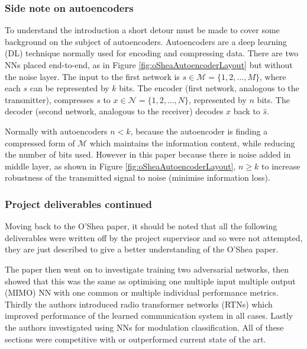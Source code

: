 \documentclass[12pt,onecolumn,letterpaper]{article}
\begin{document}
\subsubsection{Side note on autoencoders}

To understand the introduction a short detour must be made to cover some background on the subject of autoencoders. Autoencoders are a deep learning (DL) technique normally used for encoding and compressing data. There are two NNs placed end-to-end, as in Figure \ref{fig:oSheaAutoencoderLayout} but without the noise layer. The input to the first network is $s \in \mathcal{M} = \{1,2,\dots,M\}$, where each $s$ can be represented by $k$ bits. The encoder (first network, analogous to the transmitter), compresses $s$ to $x \in \mathcal{N} = \{1,2,\dots,N\}$, represented by $n$ bits. The decoder (second network, analogous to the receiver) decodes $x$ back to $\hat{s}$.

Normally with autoencoders $n < k$, because the autoencoder is finding a compressed form of $\mathcal{M}$ which maintains the information content, while reducing the number of bits used. However in this paper because there is noise added in middle layer, as shown in Figure \ref{fig:oSheaAutoencoderLayout}, $n \geq k$ to increase robustness of the transmitted signal to noise (minimise information loss).

\subsubsection{Project deliverables continued}
\label{sec:deliverables}

Moving back to the O'Shea paper, it should be noted that all the following deliverables were written off by the project supervisor and so were not attempted, they are just described to give a better understanding of the O'Shea paper. 

The paper then went on to investigate training two adversarial networks, then showed that this was the same as optimising one multiple input multiple output (MIMO) NN with one common or multiple individual performance metrics. Thirdly the authors introduced radio transformer networks (RTNs) which improved performance of the learned communication system in all cases. Lastly the authors investigated using NNs for modulation classification. All of these sections were competitive with or outperformed current state of the art. 
\end{document}
